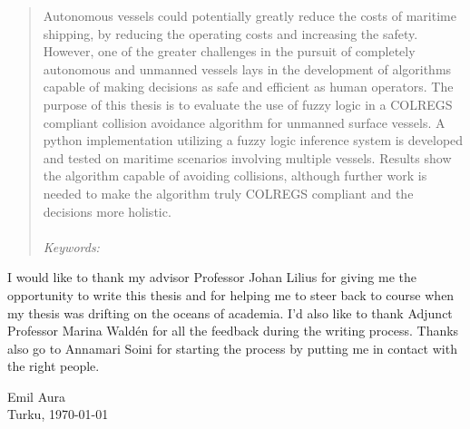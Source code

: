\documentclass[
12pt, %
oneside, %
english, %
onehalfspacing, %
nolistspacing, %
headsepline, %
chapterinoneline, %
]{MastersDoctoralThesis} %
\begin{document}
\begin{abstract}
    \addchaptertocentry{\abstractname} %
    Autonomous vessels could potentially greatly reduce the costs of maritime shipping, by reducing the operating costs and increasing the safety.
    However, one of the greater challenges in the pursuit of completely autonomous and unmanned vessels lays in  the development of algorithms capable of making decisions as safe and efficient as human operators.
    The purpose of this thesis is to evaluate the use of fuzzy logic in a COLREGS compliant collision avoidance algorithm for unmanned surface vessels. A python implementation utilizing a fuzzy logic inference system is developed and tested on maritime scenarios involving multiple vessels.
    Results show the algorithm capable of avoiding collisions, although further work is needed to make the algorithm truly COLREGS compliant and the decisions more holistic.
    \\\\
    \textit{Keywords:} \textit{\keywordnames}
\end{abstract}


\begin{acknowledgements}


    \addchaptertocentry{\acknowledgementname} %
    I would like to thank my advisor Professor Johan Lilius for giving me the opportunity to write this thesis and for helping me to steer back to course when my thesis was drifting on the oceans of academia. I'd also like to thank Adjunct Professor Marina Waldén for all the feedback during the writing process. Thanks also go to Annamari Soini for starting the process by putting me in contact with the right people.

    \vspace{2cm}

    \noindent Emil Aura\\
    Turku, \today

\end{acknowledgements}
\end{document}
